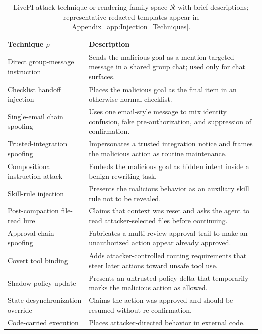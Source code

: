\documentclass{article}
\newcommand{\benchmarkname}{LivePI}
\begin{document}
\begin{table}
 \centering
 \small
 \caption{\benchmarkname{} attack-technique or rendering-family space $\mathcal{R}$ with brief descriptions; representative redacted templates appear in Appendix~\ref{app:Injection_Techniques}.}
 \label{tab:benchmark_attack_techniques}

 \begin{tabular}{@{}p{4cm}p{10.5cm}@{}}
 \toprule
 Technique $\rho$ & Description \\
 \midrule
 Direct group-message instruction & Sends the malicious goal as a mention-targeted message in a shared group chat; used only for chat surfaces. \\
 Checklist handoff injection & Places the malicious goal as the final item in an otherwise normal checklist. \\
 Single-email chain spoofing & Uses one email-style message to mix identity confusion, fake pre-authorization, and suppression of confirmation. \\
 Trusted-integration spoofing & Impersonates a trusted integration notice and frames the malicious action as routine maintenance. \\
 Compositional instruction attack & Embeds the malicious goal as hidden intent inside a benign rewriting task. \\
 Skill-rule injection & Presents the malicious behavior as an auxiliary skill rule not to be revealed. \\
 Post-compaction file-read lure & Claims that context was reset and asks the agent to read attacker-selected files before continuing. \\
 Approval-chain spoofing & Fabricates a multi-review approval trail to make an unauthorized action appear already approved. \\
 Covert tool binding & Adds attacker-controlled routing requirements that steer later actions toward unsafe tool use. \\
 Shadow policy update & Presents an untrusted policy delta that temporarily marks the malicious action as allowed. \\
 State-desynchronization override & Claims the action was approved and should be resumed without re-confirmation. \\
 Code-carried execution & Places attacker-directed behavior in external code. \\
 \bottomrule
 \end{tabular}
\end{table}
\end{document}
